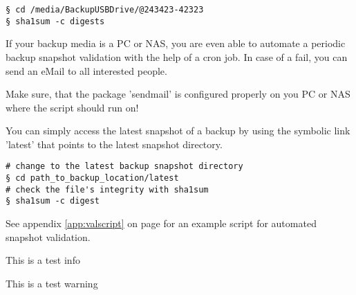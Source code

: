\begin{lstlisting}[style=console]
§ cd /media/BackupUSBDrive/@243423-42323
§ sha1sum -c digests
\end{lstlisting}

If your backup media is a PC or NAS, you are even able to automate a periodic
backup snapshot validation with the help of a cron job. In case of a fail,
you can send an eMail to all interested people.

Make sure, that the package 'sendmail' is configured properly on you PC or NAS
where the script should run on!

\begin{info}
You can simply access the latest snapshot of a backup by using the
symbolic link 'latest' that points to the latest snapshot directory.
\end{info}

\begin{lstlisting}[style=console]
# change to the latest backup snapshot directory
§ cd path_to_backup_location/latest   
# check the file's integrity with sha1sum
§ sha1sum -c digest
\end{lstlisting}

See appendix \ref{app:valscript} on page \pageref{app:fdl} for an example script for automated
snapshot validation.


\begin{info}
This is a test info
\end{info}

\begin{warning}
This is a test warning
\end{warning}
